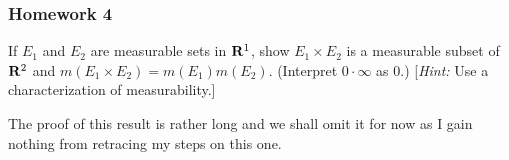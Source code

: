 \subsubsection{Homework 4}
\setcounter{exercise}{0}
\setcounter{equation}{0}


\begin{problem}
  If $E_1$ and $E_2$ are measurable sets in $\mathbf{R}^1$, show $E_1\times E_2$
  is a measurable subset of $\mathbf{R}^2$ and $m(E_1\times
  E_2)=m(E_1)m(E_2)$. (Interpret $0\cdot\infty$ as $0$.) [\emph{Hint:} Use
  a characterization of measurability.]
\end{problem}
\begin{solution}
  The proof of this result is rather long and we shall omit it for now as I
  gain nothing from retracing my steps on this one.
\end{solution}

